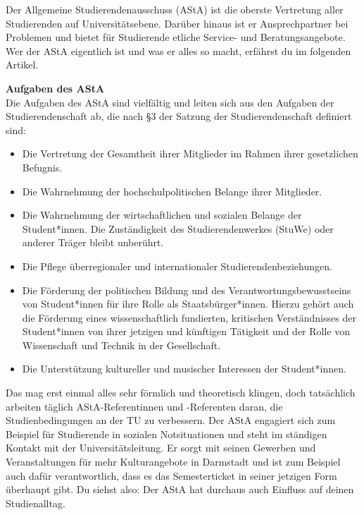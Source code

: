 {Der Allgemeine Studierendenausschuss (AStA) ist die oberste Vertretung aller Studierenden auf Universitätsebene. Darüber hinaus ist er Ansprechpartner bei Problemen und bietet für Studierende etliche Service- und Beratungsangebote.
    Wer der AStA eigentlich ist und was er alles so macht, erfährst du im folgenden Artikel.
}{
    \noindent\textbf{Aufgaben des AStA}\\
    Die Aufgaben des AStA sind vielfältig und leiten sich aus den Aufgaben der Studierendenschaft ab, die nach §3 der Satzung der Studierendenschaft definiert sind:

    \begin{itemize}
        \item	Die Vertretung der Gesamtheit ihrer Mitglieder im Rahmen ihrer gesetzlichen Befugnis.
        \item	Die Wahrnehmung der hochschulpolitischen Belange ihrer Mitglieder.
        \item	Die Wahrnehmung der wirtschaftlichen und sozialen Belange der Student*innen. Die Zuständigkeit des Studierendenwerkes (StuWe) oder anderer Träger bleibt unberührt.
        \item	Die Pflege überregionaler und internationaler Studierendenbeziehungen.
        \item	Die Förderung der politischen Bildung und des Verantwortungsbewusstseins von Student*innen für ihre Rolle als Staatsbürger*innen. Hierzu gehört auch die Förderung eines wissenschaftlich fundierten, kritischen Verständnisses der Student*innen von ihrer jetzigen und künftigen Tätigkeit und der Rolle von Wissenschaft und Technik in der Gesellschaft.
        \item	Die Unterstützung kultureller und musischer Interessen der Student*innen.
    \end{itemize}

    Das mag erst einmal alles sehr förmlich und theoretisch klingen, doch tatsächlich arbeiten täglich AStA-Referentinnen und -Referenten daran, die Studienbedingungen an der TU zu verbessern. Der AStA engagiert sich zum Beispiel für Studierende in sozialen Notsituationen und steht im ständigen Kontakt mit der Universitätsleitung. Er sorgt mit seinen Gewerben und Veranstaltungen für mehr Kulturangebote in Darmstadt und ist zum Beispiel auch dafür verantwortlich, dass es das Semesterticket in seiner jetzigen Form überhaupt gibt.
    Du siehst also: Der AStA hat durchaus auch Einfluss auf deinen Studienalltag.\\

}
